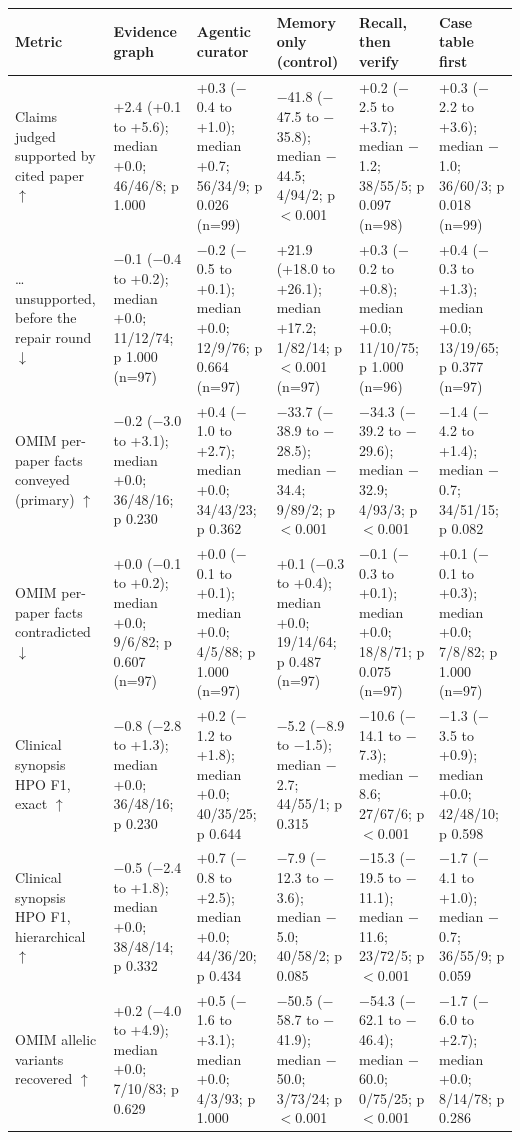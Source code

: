 \documentclass{article} %
\begin{document}
\begin{table}[!htbp]
\begin{tabularx}{\linewidth}{>{\raggedright\arraybackslash}p{2.2cm}>{\centering\arraybackslash}X>{\centering\arraybackslash}X>{\centering\arraybackslash}X>{\centering\arraybackslash}X>{\centering\arraybackslash}X}
\toprule
Metric & Evidence graph & Agentic curator & Memory only (control) & Recall, then verify & Case table first \\
\midrule
Claims judged supported by cited paper $\uparrow$ & +2.4 (+0.1 to +5.6); median +0.0; 46/46/8; p 1.000 & +0.3 ($-$0.4 to +1.0); median +0.7; 56/34/9; p 0.026 (n=99) & $-$41.8 ($-$47.5 to $-$35.8); median $-$44.5; 4/94/2; p $<$0.001 & +0.2 ($-$2.5 to +3.7); median $-$1.2; 38/55/5; p 0.097 (n=98) & +0.3 ($-$2.2 to +3.6); median $-$1.0; 36/60/3; p 0.018 (n=99) \\
\ldots{} unsupported, before the repair round $\downarrow$ & $-$0.1 ($-$0.4 to +0.2); median +0.0; 11/12/74; p 1.000 (n=97) & $-$0.2 ($-$0.5 to +0.1); median +0.0; 12/9/76; p 0.664 (n=97) & +21.9 (+18.0 to +26.1); median +17.2; 1/82/14; p $<$0.001 (n=97) & +0.3 ($-$0.2 to +0.8); median +0.0; 11/10/75; p 1.000 (n=96) & +0.4 ($-$0.3 to +1.3); median +0.0; 13/19/65; p 0.377 (n=97) \\
OMIM per-paper facts conveyed (primary) $\uparrow$ & $-$0.2 ($-$3.0 to +3.1); median +0.0; 36/48/16; p 0.230 & +0.4 ($-$1.0 to +2.7); median +0.0; 34/43/23; p 0.362 & $-$33.7 ($-$38.9 to $-$28.5); median $-$34.4; 9/89/2; p $<$0.001 & $-$34.3 ($-$39.2 to $-$29.6); median $-$32.9; 4/93/3; p $<$0.001 & $-$1.4 ($-$4.2 to +1.4); median $-$0.7; 34/51/15; p 0.082 \\
OMIM per-paper facts contradicted $\downarrow$ & +0.0 ($-$0.1 to +0.2); median +0.0; 9/6/82; p 0.607 (n=97) & +0.0 ($-$0.1 to +0.1); median +0.0; 4/5/88; p 1.000 (n=97) & +0.1 ($-$0.3 to +0.4); median +0.0; 19/14/64; p 0.487 (n=97) & $-$0.1 ($-$0.3 to +0.1); median +0.0; 18/8/71; p 0.075 (n=97) & +0.1 ($-$0.1 to +0.3); median +0.0; 7/8/82; p 1.000 (n=97) \\
Clinical synopsis HPO F1, exact $\uparrow$ & $-$0.8 ($-$2.8 to +1.3); median +0.0; 36/48/16; p 0.230 & +0.2 ($-$1.2 to +1.8); median +0.0; 40/35/25; p 0.644 & $-$5.2 ($-$8.9 to $-$1.5); median $-$2.7; 44/55/1; p 0.315 & $-$10.6 ($-$14.1 to $-$7.3); median $-$8.6; 27/67/6; p $<$0.001 & $-$1.3 ($-$3.5 to +0.9); median +0.0; 42/48/10; p 0.598 \\
Clinical synopsis HPO F1, hierarchical $\uparrow$ & $-$0.5 ($-$2.4 to +1.8); median +0.0; 38/48/14; p 0.332 & +0.7 ($-$0.8 to +2.5); median +0.0; 44/36/20; p 0.434 & $-$7.9 ($-$12.3 to $-$3.6); median $-$5.0; 40/58/2; p 0.085 & $-$15.3 ($-$19.5 to $-$11.1); median $-$11.6; 23/72/5; p $<$0.001 & $-$1.7 ($-$4.1 to +1.0); median $-$0.7; 36/55/9; p 0.059 \\
OMIM allelic variants recovered $\uparrow$ & +0.2 ($-$4.0 to +4.9); median +0.0; 7/10/83; p 0.629 & +0.5 ($-$1.6 to +3.1); median +0.0; 4/3/93; p 1.000 & $-$50.5 ($-$58.7 to $-$41.9); median $-$50.0; 3/73/24; p $<$0.001 & $-$54.3 ($-$62.1 to $-$46.4); median $-$60.0; 0/75/25; p $<$0.001 & $-$1.7 ($-$6.0 to +2.7); median +0.0; 8/14/78; p 0.286 \\

\end{tabularx}
\end{table}
\end{document}
